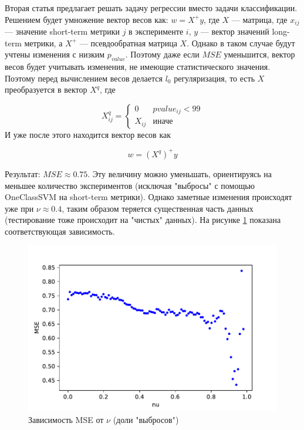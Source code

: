 \documentclass{article}
\begin{document}
	Вторая статья предлагает решать задачу регрессии вместо задачи классификации. Решением будет умножение вектор весов как: $w = X^+y$, где $X$ --- матрица, где $x_{ij}$ --- значение short-term метрики $j$ в эксперименте $i$, $y$ --- вектор значений long-term метрики, а $X^+$ --- псевдообратная матрица $X$. Однако в таком случае будут учтены изменения с низким $p_{value}$. Поэтому даже если $MSE$ уменьшится, вектор весов будет учитывать изменения, не имеющие статистического значения. Поэтому перед вычислением весов делается $l_0$ регуляризация, то есть $X$ преобразуется в вектор $X^q$, где 
	
	\begin{equation*}
		X^q_{ij} = 
		\begin{cases}
			0 &\text{$pvalue_{ij} < 99$}\\
			X_{ij} &\text{иначе}
		\end{cases}
	\end{equation*}
	И уже после этого находится вектор весов как 
	
	$$w = (X^q)^+y$$
	
	Результат: $MSE \approx 0.75$. Эту величину можно уменьшать, ориентируясь на меньшее количество экспериментов (исключая "выбросы" с помощью OneClassSVM на short-term метрики). Однако заметные изменения происходят уже при $\nu \approx 0.4$, таким образом теряется существенная часть данных (тестирование тоже происходит на "чистых" данных). На рисунке \ref{fig:mse} показана соответствующая зависимость. \\
	
	\begin{figure}[h]
		\includegraphics[scale=1]{MSE_nu_dependency.pdf}
		\caption{Зависимость MSE от $\nu$ (доли "выбросов")}
		\label{fig:mse}
	\end{figure}
	
\end{document}
